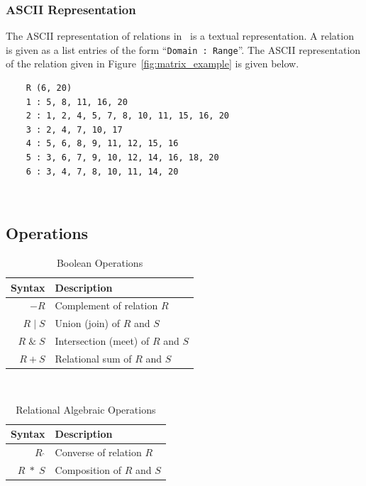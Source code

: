
\subsubsection{ASCII Representation}
\label{ssub:ascii_representation}

The ASCII representation of relations in \relview\ is a textual representation. A relation is given as a list entries of the form ``\texttt{Domain : Range}''. The ASCII representation of the relation given in Figure~\ref{fig:matrix_example} is given below. \newpage

\begin{lstlisting}
	R (6, 20)
	1 : 5, 8, 11, 16, 20
	2 : 1, 2, 4, 5, 7, 8, 10, 11, 15, 16, 20
	3 : 2, 4, 7, 10, 17
	4 : 5, 6, 8, 9, 11, 12, 15, 16
	5 : 3, 6, 7, 9, 10, 12, 14, 16, 18, 20
	6 : 3, 4, 7, 8, 10, 11, 14, 20
\end{lstlisting}~



\subsection{Operations}
\label{sub:operations}

\begin{table}[ht]
\label{tbl:bool_ops}
	\centering
	\begin{tabular}{|r|l|}
		\hline
		Syntax & Description \\ \hline \hline
		$-R$ &  Complement\index{complement} of relation $R$\\ 
		$R \;|\; S$ & Union\index{set!union} (join) of $R$ and $S$ \\ 
		$R \;\&\; S$ & Intersection\index{set!intersection} (meet) of $R$ and $S$ \\  
		$R + S$ & Relational sum\index{relational sum} of $R$ and $S$ \\  \hline 
	\end{tabular}
	\caption{Boolean Operations}					
\end{table} ~

\begin{table}[ht]
\label{tbl:RA_ops}
	\centering
	\begin{tabular}{|r|l|}
		\hline
		Syntax & Description \\ \hline \hline
		$R\;\hat{}$ & Converse\index{converse} of relation $R$ \\ 
		$R \;*\; S$ & Composition\index{composition} of $R$ and $S$ \\ \hline 
	\end{tabular}
	\caption{Relational Algebraic Operations}					
\end{table} ~

